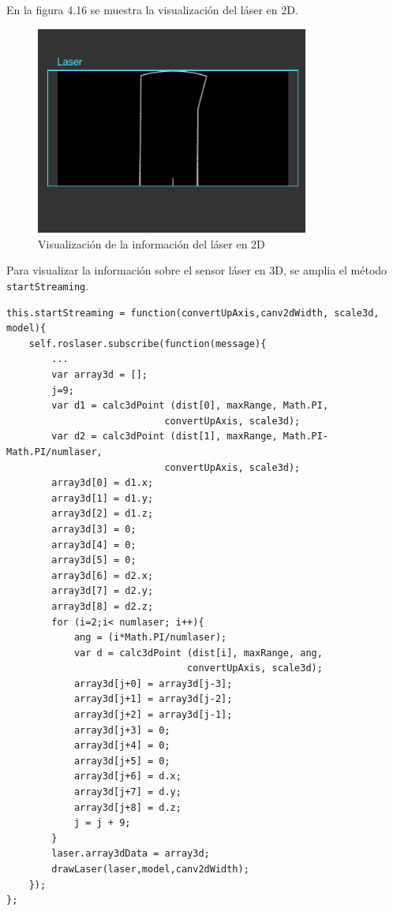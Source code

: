 En la figura 4.16 se muestra la visualización del láser en 2D.

\begin{figure}[H]
  \begin{center}
    \includegraphics[width=0.8\textwidth]{figures/laser2dturtle.png}
		\caption{Visualización de la información del láser en 2D}
		\label{fig.laser2dturtle}
		\end{center}
\end{figure}

Para visualizar la información sobre el sensor láser en 3D, se amplia el método \texttt{startStreaming}.

\begin{lstlisting}[caption= Subscripción y tratamiento del mensaje para su visualización 3D label=cod.subslaser3D]
this.startStreaming = function(convertUpAxis,canv2dWidth, scale3d, model){
	self.roslaser.subscribe(function(message){
		...
		var array3d = [];
		j=9;
		var d1 = calc3dPoint (dist[0], maxRange, Math.PI, 
							convertUpAxis, scale3d);
		var d2 = calc3dPoint (dist[1], maxRange, Math.PI-Math.PI/numlaser, 
							convertUpAxis, scale3d);
		array3d[0] = d1.x;
		array3d[1] = d1.y;
		array3d[2] = d1.z;
		array3d[3] = 0;
		array3d[4] = 0;
		array3d[5] = 0;
		array3d[6] = d2.x;
		array3d[7] = d2.y;
		array3d[8] = d2.z;
		for (i=2;i< numlaser; i++){
			ang = (i*Math.PI/numlaser);
			var d = calc3dPoint (dist[i], maxRange, ang, 
								convertUpAxis, scale3d);
			array3d[j+0] = array3d[j-3];
			array3d[j+1] = array3d[j-2];
			array3d[j+2] = array3d[j-1];
			array3d[j+3] = 0;
			array3d[j+4] = 0;
			array3d[j+5] = 0;
			array3d[j+6] = d.x;
			array3d[j+7] = d.y;
			array3d[j+8] = d.z;
			j = j + 9;
		}
		laser.array3dData = array3d;
		drawLaser(laser,model,canv2dWidth);	
	});
};
\end{lstlisting}

